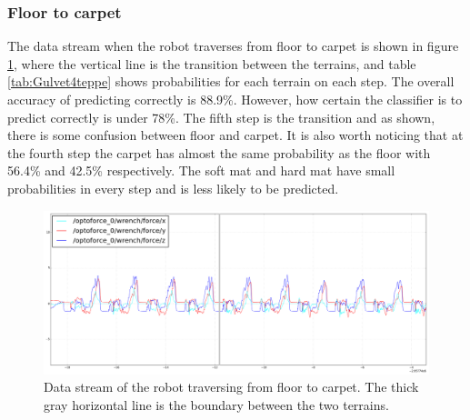 \documentclass[USenglish]{ifimaster}  %
\begin{document}
\subsubsection{Floor to carpet}
The data stream when the robot traverses from floor to carpet is shown in figure \ref{fig:gulvet4teppegraf}, where the vertical line is the transition between the terrains, and table \ref{tab:Gulvet4teppe} shows probabilities for each terrain on each step. The overall accuracy of predicting correctly is 88.9\%. However, how certain the classifier is to predict correctly is under 78\%. The fifth step is the transition and as shown, there is some confusion between floor and carpet. It is also worth noticing that at the fourth step the carpet has almost the same probability as the floor with 56.4\% and 42.5\% respectively. The soft mat and hard mat have small probabilities in every step and is less likely to be predicted.
	
	\begin{figure}[h]
		\centering
		\includegraphics[width=\textwidth,height=\textheight,keepaspectratio]{Figures/Gulvet4Teppe2_line2}
		\caption[Data stream of the transition from floor to carpet]{Data stream of the robot traversing from floor to carpet. The thick gray horizontal line is the boundary between the two terrains.}
		\label{fig:gulvet4teppegraf}
	\end{figure}
	
\end{document}

